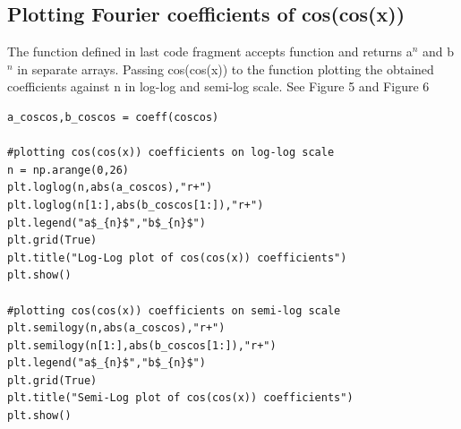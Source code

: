 \documentclass[a4paper]{article}
\begin{document}
\subsection{Plotting Fourier coefficients of cos(cos(x))}
The function defined in last code fragment accepts function and returns a$^{n}$ and b$^{n}$ in separate arrays.
Passing cos(cos(x)) to the function plotting the obtained coefficients against n in log-log and semi-log scale. See Figure 5 and Figure 6
\begin{lstlisting}
a_coscos,b_coscos = coeff(coscos)

#plotting cos(cos(x)) coefficients on log-log scale
n = np.arange(0,26)
plt.loglog(n,abs(a_coscos),"r+")
plt.loglog(n[1:],abs(b_coscos[1:]),"r+")
plt.legend("a$_{n}$","b$_{n}$")
plt.grid(True)
plt.title("Log-Log plot of cos(cos(x)) coefficients")
plt.show()

#plotting cos(cos(x)) coefficients on semi-log scale
plt.semilogy(n,abs(a_coscos),"r+")
plt.semilogy(n[1:],abs(b_coscos[1:]),"r+")
plt.legend("a$_{n}$","b$_{n}$")
plt.grid(True)
plt.title("Semi-Log plot of cos(cos(x)) coefficients")
plt.show()

\end{lstlisting}
\end{document}

